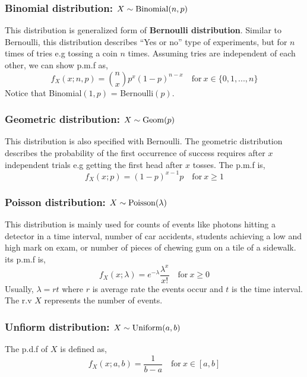 \subsubsection*{Binomial distribution:  $ X \sim \operatorname{Binomial}(n,p)$}
This distribution is generalized form of \textbf{Bernoulli distribution}. Similar to Bernoulli, this distribution describes ``Yes or no'' type of experiments, but for $n$ times of tries e.g tossing a coin $n$ times. Assuming tries are independent of each other, we can show p.m.f as,
\[f_X(x; n,p) = \binom{n}{x}p^x(1-p)^{n-x} \quad \text{for} \ x \in \{0,1,...,n\}\]
Notice that Binomial$(1,p)$ = Bernoulli$(p)$.
\subsubsection*{Geometric distribution: $X \sim \operatorname{Geom}(p)$}
This distribution is also specified with Bernoulli. The geometric distribution describes the probability of the first occurrence of success requires after $x$ independent trials e.g getting the first head after $x$ tosses. The p.m.f is,
\[ f_{X}(x; p) = (1-p)^{x-1}p \quad \text{for} \ x \ge 1 \]
\subsubsection*{Poisson distribution: $X \sim \operatorname{Poisson}(\lambda)$}
This distribution is mainly used for counts of events like photons hitting a detector in a time interval, number of car accidents, students achieving a low and high mark on exam, or number of pieces of chewing gum on a tile of a sidewalk. its p.m.f is,
\[f_X(x; \lambda) = e^{-\lambda} \frac{\lambda^{x}}{x!} \quad \text{for} \ x \ge 0 \]
Usually, $\lambda = rt$ where $r$ is average rate the events occur and $t$ is the time interval. The r.v $X$ represents the number of events.
\subsubsection*{Unfiorm distribution: $X \sim \operatorname{Uniform}(a,b)$}
The p.d.f of $X$ is defined as,
\[f_X(x; a,b)= \frac{1}{b-a} \quad \text{for} \ x \in [a,b]\]
